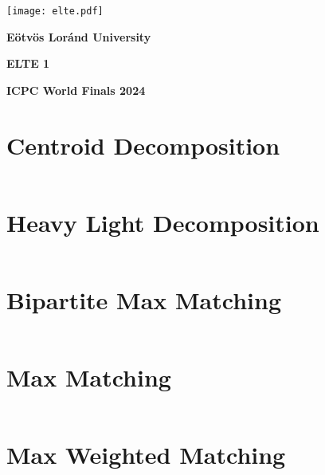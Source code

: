 \documentclass[12pt,english]{article}
\begin{document}
\begin{titlepage}
    \begin{center}
        \vspace*{\fill}
        \texttt{[image: elte.pdf]}

        \vspace*{0.5cm}
        
        \textbf{Eötvös Loránd University}
        
        \vspace*{1cm}
        
        {\Huge \textbf{ELTE 1}}
        \vspace*{\fill}
             
        \textbf{ICPC World Finals 2024}
    \end{center}
 \end{titlepage}

\section{Centroid Decomposition}
\inputminted[autogobble,breaklines,mathescape,linenos,numbersep=5pt,xleftmargin=0pt,fontsize=\footnotesize]{cpp}{codes/centroid.tex}

\section{Heavy Light Decomposition}
\inputminted[autogobble,breaklines,mathescape,linenos,numbersep=5pt,xleftmargin=0pt,fontsize=\footnotesize]{cpp}{codes/heavylight.tex}

\section{Bipartite Max Matching}
\inputminted[autogobble,breaklines,mathescape,linenos,numbersep=5pt,xleftmargin=0pt,fontsize=\footnotesize]{cpp}{codes/hopcroft_carp.tex}

\section{Max Matching}
\inputminted[autogobble,breaklines,mathescape,linenos,numbersep=5pt,xleftmargin=0pt,fontsize=\footnotesize]{cpp}{codes/max_matching.tex}

\section{Max Weighted Matching}
\inputminted[autogobble,breaklines,mathescape,linenos,numbersep=5pt,xleftmargin=0pt,fontsize=\footnotesize]{cpp}{codes/max_weighted_matching.tex}
\end{document}

